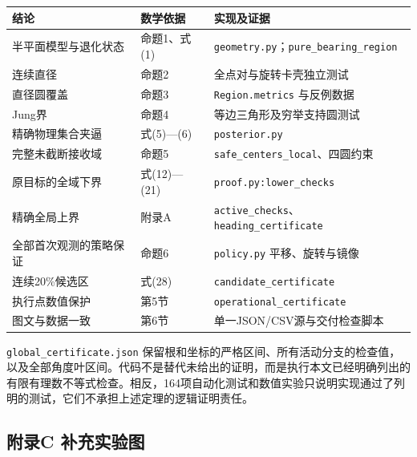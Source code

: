 \documentclass[
  11pt,
  fontset=none]{ctexart}
\newcounter{none} %
\begin{document}
{\def\LTcaptype{none} %
\begin{longtable}[]{@{}
  >{\raggedright\arraybackslash}p{}
  >{\raggedright\arraybackslash}p{}
  >{\raggedright\arraybackslash}p{}@{}}
\toprule\noalign{}
\begin{minipage}[b]{\linewidth}\raggedright
结论
\end{minipage} & \begin{minipage}[b]{\linewidth}\raggedright
数学依据
\end{minipage} & \begin{minipage}[b]{\linewidth}\raggedright
实现及证据
\end{minipage} \\
\midrule\noalign{}
\endhead
\bottomrule\noalign{}
\endlastfoot
半平面模型与退化状态 & 命题1、式(1) &
\texttt{geometry.py}；\texttt{pure\_bearing\_region} \\
连续直径 & 命题2 & 全点对与旋转卡壳独立测试 \\
直径圆覆盖 & 命题3 & \texttt{Region.metrics} 与反例数据 \\
Jung界 & 命题4 & 等边三角形及穷举支持圆测试 \\
精确物理集合夹逼 & 式(5)---(6) & \texttt{posterior.py} \\
完整未截断接收域 & 命题5 & \texttt{safe\_centers\_local}、四圆约束 \\
原目标的全域下界 & 式(12)---(21) & \texttt{proof.py:lower\_checks} \\
精确全局上界 & 附录A &
\texttt{active\_checks}、\texttt{heading\_certificate} \\
全部首次观测的策略保证 & 命题6 & \texttt{policy.py} 平移、旋转与镜像 \\
连续20\%候选区 & 式(28) & \texttt{candidate\_certificate} \\
执行点数值保护 & 第5节 & \texttt{operational\_certificate} \\
图文与数据一致 & 第6节 & 单一JSON/CSV源与交付检查脚本 \\
\end{longtable}
}

\texttt{global\_certificate.json}
保留根和坐标的严格区间、所有活动分支的检查值，以及全部角度叶区间。代码不是替代未给出的证明，而是执行本文已经明确列出的有限有理数不等式检查。相反，164项自动化测试和数值实验只说明实现通过了列明的测试，它们不承担上述定理的逻辑证明责任。

\subsection{附录C
补充实验图}\label{ux9644ux5f55c-ux8865ux5145ux5b9eux9a8cux56fe}
\end{document}
